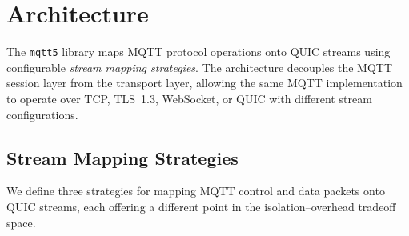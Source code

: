 \section{Architecture}
\label{sec:architecture}

The \texttt{mqtt5} library maps MQTT protocol operations onto QUIC streams using configurable \emph{stream mapping strategies}. The architecture decouples the MQTT session layer from the transport layer, allowing the same MQTT implementation to operate over TCP, TLS~1.3, WebSocket, or QUIC with different stream configurations.

\subsection{Stream Mapping Strategies}

We define three strategies for mapping MQTT control and data packets onto QUIC streams, each offering a different point in the isolation--overhead tradeoff space.

